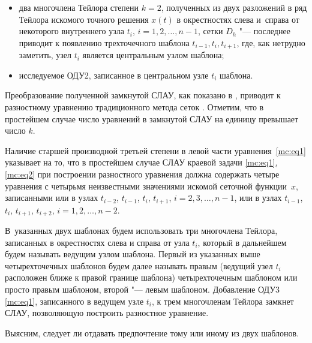 \begin{itemize}



\item[а)] два многочлена Тейлора степени $   k=2$, полученных из двух разложений в ряд Тейлора искомого точного решения $x(t)$ в окрестностях слева и~справа от некоторого внутреннего узла $   t_i$, $i=1,  2,  \dots,  n-1$, сетки $   D_h$ "--- последнее приводит к появлению трехточечного шаблона $   t_{i-1},  t_i,  t_{i+1}$, где, как нетрудно заметить, узел $   t_i$ является центральным узлом шаблона;



\item[б)] исследуемое ОДУ2, записанное в центральном узле $   t_i$ шаблона.





\end{itemize}



Преобразование полученной замкнутой СЛАУ, как показано в \cite{mc:bib13}, приводит к разностному уравнению традиционного метода сеток \cite{mc:bib6}. Отметим, что в простейшем случае число уравнений в замкнутой СЛАУ на единицу превышает число $   k$.



Наличие старшей производной третьей степени в левой части уравнения~\eqref{mc:eq1} указывает на то, что в простейшем случае СЛАУ краевой задачи \eqref{mc:eq1}, \eqref{mc:eq2} при построении разностного уравнения должна содержать четыре уравнения с четырьмя неизвестными значениями искомой сеточной функции~$x$, записанными или в узлах $t_{i-2}$,  $t_{i-1}$,  $t_i$,  $t_{i+1}$, $i=2,  3,  \dots,  n-1$, или в узлах $ t_{i-1}$,  $t_{i}$,  $t_{i+1}$,  $t_{i+2}$, $i=1,  2,  \dots,  n-2$. 

В~указанных двух шаблонах будем использовать три многочлена Тейлора, записанных в окрестностях слева и справа от узла $   t_i$, который в дальнейшем будем называть ведущим узлом шаблона. Первый из указанных выше четырехточечных шаблонов будем далее называть правым (ведущий узел $   t_i$ расположен ближе к правой границе шаблона) четырехточечным шаблоном или просто правым шаблоном, второй "--- левым шаблоном. Добавление ОДУ3 \eqref{mc:eq1}, записанного в ведущем узле $   t_i$, к трем многочленам Тейлора  замкнет СЛАУ, позволяющую построить разностное уравнение.



Выясним, следует ли отдавать предпочтение тому или иному из двух шаблонов.



